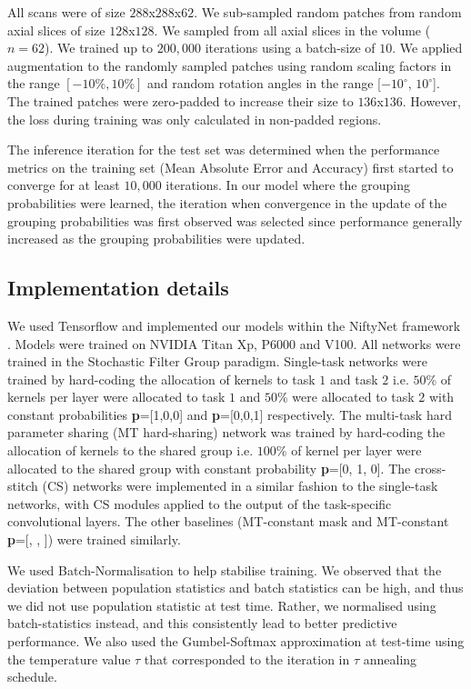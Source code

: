 All scans were of size $288$x$288$x$62$. We sub-sampled random patches from random axial slices of size $128$x$128$. We sampled from all axial slices in the volume ($n=62$). We trained up to $200,000$ iterations using a batch-size of $10$. We applied augmentation to the randomly sampled patches using random scaling factors in the range $[-10\%, 10\%]$ and random rotation angles in the range [$-10^\circ$, $10^\circ$]. The trained patches were zero-padded to increase their size to $136$x$136$. However, the loss during training was only calculated in non-padded regions.

The inference iteration for the test set was determined when the performance metrics on the training set (Mean Absolute Error and Accuracy) first started to converge for at least $10,000$ iterations. In our model where the grouping probabilities were learned, the iteration when convergence in the update of the grouping probabilities was first observed was selected since performance generally increased as the grouping probabilities were updated. 

\subsection{Implementation details}
We used Tensorflow and implemented our models within the NiftyNet framework \cite{Gibson2018}. Models were trained on NVIDIA Titan Xp, P6000 and V100. All networks were trained in the Stochastic Filter Group paradigm. Single-task networks were trained by hard-coding the allocation of kernels to task $1$ and task $2$ i.e. $50$\% of kernels per layer were allocated to task $1$ and $50$\% were allocated to task $2$ with constant probabilities \textbf{p}=[1,0,0] and \textbf{p}=[0,0,1] respectively. The multi-task hard parameter sharing (MT hard-sharing) network was trained by hard-coding the allocation of kernels to the shared group i.e. $100$\% of kernel per layer were allocated to the shared group with constant probability \textbf{p}=[0, 1, 0]. The cross-stitch (CS) \cite{MisraCrossMTL16} networks were implemented in a similar fashion to the single-task networks, with CS modules applied to the output of the task-specific convolutional layers. The other baselines (MT-constant mask and MT-constant \textbf{p}=[, , ]) were trained similarly.

We used Batch-Normalisation \cite{ioffe2015batch} to help stabilise training. We observed that the deviation between population statistics and batch statistics can be high, and thus we did not use population statistic at test time. Rather, we normalised using batch-statistics instead, and this consistently lead to better predictive performance. We also used the Gumbel-Softmax approximation \cite{jang2016categorical} at test-time using the temperature value $\tau$ that corresponded to the iteration in $\tau$ annealing schedule.

